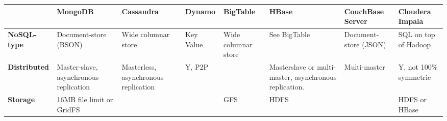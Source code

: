\documentclass{article}
\begin{document}
\begin{table}[h]
\begin{tabular}{@{}l| L{3cm}| L{3cm}| L{3cm}| L{3cm}| L{3cm}| L{3cm}| L{3cm}|@{}}
\toprule
                                    & \textbf{MongoDB}                                                                                                                                                & \textbf{Cassandra}                                                                                                       & \textbf{Dynamo}                               & \textbf{BigTable}                                                           & \textbf{HBase}                                                                     & \textbf{CouchBase Server}                                                           & \textbf{Cloudera Impala}            \\ \midrule
\textbf{NoSQL-type}                 & Document-store (BSON)                                                                                                                                           & Wide columnar store                                                                                                      & Key  Value                                   & Wide columnar store                                                         & See BigTable                                                                       & Document-store (JSON)                                                               & SQL on top of Hadoop                \\ \midrule
\textbf{Distributed}                & Master-slave, asynchronous replication                                                                                                                          & Masterless, asynchronous replication                                                                                     & Y, P2P                                        &                                                                             & Masterslave or multi-master, asynchronous replication.                            & Multi-master                                                                        & Y, not 100\% symmetric              \\ \midrule
\textbf{Storage}                    & 16MB file limit or GridFS                                                                                                                                       &                                                                                                                          &                                               & GFS                                                                         & HDFS                                                                               &                                                                                     & HDFS or HBase                       \\ \midrule

\end{tabular}
\end{table}
\end{document}
